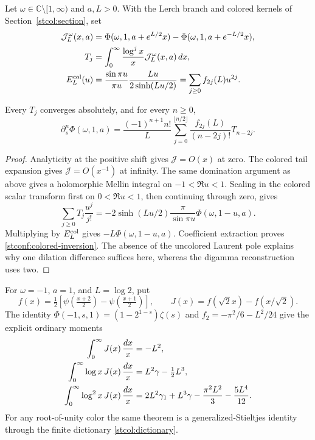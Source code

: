 Let $\omega\in\mathbb C\setminus[1,\infty)$ and $a,L>0$. With the
Lerch branch and colored kernels of Section~\ref{stcol:section}, set
\begin{align}
 \mathcal J_L^\omega(x,a)&=
      \Phi(\omega,1,a+e^{L/2}x)
          -\Phi(\omega,1,a+e^{-L/2}x),\notag\\
 T_j&=\int_0^\infty\frac{\log^j x}{x}
                                 \mathcal J_L^\omega(x,a)\,dx,\notag\\
 E_L^{\rm col}(u)&=\frac{\sin\pi u}{\pi u}
                         \frac{Lu}{2\sinh(Lu/2)}
                    =\sum_{j\ge0}f_{2j}(L)u^{2j}.
\end{align}
\begin{theorem}
\label{stconf:colored-endpoint}
Every $T_j$ converges absolutely, and for every $n\ge0$,
\begin{equation}\label{stconf:colored-inversion}
 \partial_s^n\Phi(\omega,1,a)
 =\frac{(-1)^{n+1}n!}{L}
     \sum_{j=0}^{\lfloor n/2\rfloor}
             \frac{f_{2j}(L)}{(n-2j)!}T_{n-2j}.
\end{equation}
\end{theorem}
\begin{proof}
Analyticity at the positive shift gives $\mathcal J=O(x)$ at zero.
The colored tail expansion gives $\mathcal J=O(x^{-1})$ at infinity.
The same domination argument as above gives a holomorphic Mellin
integral on $-1<\Re u<1$. Scaling in the colored scalar transform
first on $0<\Re u<1$, then continuing through zero, gives
\[
 \sum_{j\ge0}T_j\frac{u^j}{j!}
  =-2\sinh(Lu/2)\frac\pi{\sin\pi u}\Phi(\omega,1-u,a).
\]
Multiplying by $E_L^{\rm col}$ gives $-L\Phi(\omega,1-u,a)$.
Coefficient extraction proves \eqref{stconf:colored-inversion}.
The absence of the uncolored Laurent pole explains why one dilation
difference suffices here, whereas the digamma reconstruction uses two.
\end{proof}

For $\omega=-1$, $a=1$, and $L=\log2$, put
\[
 f(x)=\tfrac12\left[\psi\left(\tfrac{x+2}{2}\right)
                        -\psi\left(\tfrac{x+1}{2}\right)\right],
 \qquad J(x)=f(\sqrt2x)-f(x/\sqrt2).
\]
The identity $\Phi(-1,s,1)=(1-2^{1-s})\zeta(s)$ and
$f_2=-\pi^2/6-L^2/24$ give the explicit ordinary moments
\begin{align}
 \int_0^\infty J(x)\,\frac{dx}{x}&=-L^2,\notag\\
 \int_0^\infty \log x\,J(x)\,\frac{dx}{x}
     &=L^2\gamma-\tfrac12L^3,\notag\\
 \int_0^\infty \log^2x\,J(x)\,\frac{dx}{x}
     &=2L^2\gamma_1+L^3\gamma-\frac{\pi^2L^2}{3}
                                       -\frac{5L^4}{12}.
        \label{stconf:alternating-example}
\end{align}
For any root-of-unity color the same theorem is a generalized-Stieltjes
identity through the finite dictionary \eqref{stcol:dictionary}.

